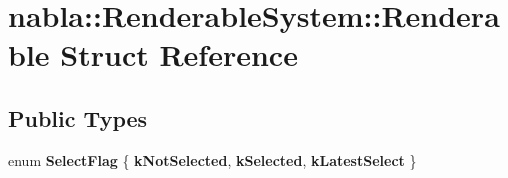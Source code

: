 \hypertarget{structnabla_1_1_renderable_system_1_1_renderable}{}\section{nabla\+::Renderable\+System\+::Renderable Struct Reference}
\label{structnabla_1_1_renderable_system_1_1_renderable}
\subsection*{Public Types}
\begin{DoxyCompactItemize}
\item 
\mbox{\label{structnabla_1_1_renderable_system_1_1_renderable_a8080b10e01c1a051299932fcb168f96d}} 
enum {\bfseries Select\+Flag} \{ {\bfseries k\+Not\+Selected}, 
{\bfseries k\+Selected}, 
{\bfseries k\+Latest\+Select}
 \}
\end{DoxyCompactItemize}
